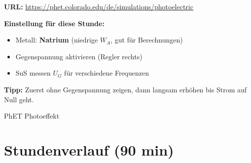 \documentclass[11pt,a4paper]{article}
\begin{document}
\begin{tcolorbox}[infobox={PhET Photoeffekt -- Gegenfeld-Funktion}]
\begin{minipage}{0.7\textwidth}
\textbf{URL:} \url{https://phet.colorado.edu/de/simulations/photoelectric}

\textbf{Einstellung für diese Stunde:}
\begin{itemize}[nosep]
\item Metall: \textbf{Natrium} (niedrige $W_A$, gut für Berechnungen)
\item Gegenspannung aktivieren (Regler rechts)
\item SuS messen $U_G$ für verschiedene Frequenzen
\end{itemize}

\textbf{Tipp:} Zuerst ohne Gegenspannung zeigen, dann langsam erhöhen bis Strom auf Null geht.
\end{minipage}
\hfill
\begin{minipage}{0.25\textwidth}
\centering
{}

\vspace{0.2cm}
{\scriptsize PhET Photoeffekt}
\end{minipage}
\end{tcolorbox}

\vspace{0.5em}


\section*{Stundenverlauf (90 min)}
\end{document}
